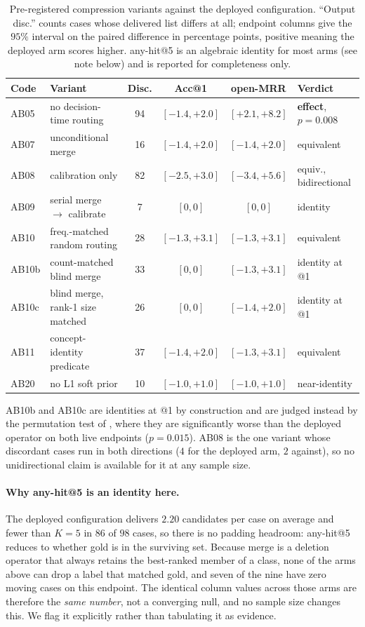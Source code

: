\begin{table}[t]
\centering
\scriptsize
\caption{Pre-registered compression variants against the deployed configuration. ``Output disc.'' counts cases whose delivered list differs at all; endpoint columns give the $95\%$ interval on the paired difference in percentage points, positive meaning the deployed arm scores higher. any-hit@5 is an algebraic identity for most arms (see note below) and is reported for completeness only.}
\label{tab:eq-equiv}
\begin{tabular}{llcccl}
\toprule
Code & Variant & Disc. & Acc@1 & open-MRR & Verdict \\
\midrule
AB05 & no decision-time routing & 94 & $[-1.4,+2.0]$ & $\mathbf{[+2.1,+8.2]}$ & \textbf{effect}, $p=0.008$ \\
AB07 & unconditional merge & 16 & $[-1.4,+2.0]$ & $[-1.4,+2.0]$ & equivalent \\
AB08 & calibration only & 82 & $[-2.5,+3.0]$ & $[-3.4,+5.6]$ & equiv., bidirectional \\
AB09 & serial merge $\rightarrow$ calibrate & 7 & $[0,0]$ & $[0,0]$ & identity \\
AB10 & freq.-matched random routing & 28 & $[-1.3,+3.1]$ & $[-1.3,+3.1]$ & equivalent \\
AB10b & count-matched blind merge & 33 & $[0,0]$ & $[-1.3,+3.1]$ & identity at @1 \\
AB10c & blind merge, rank-1 size matched & 26 & $[0,0]$ & $[-1.4,+2.0]$ & identity at @1 \\
AB11 & concept-identity predicate & 37 & $[-1.4,+2.0]$ & $[-1.3,+3.1]$ & equivalent \\
AB20 & no L1 soft prior & 10 & $[-1.0,+1.0]$ & $[-1.0,+1.0]$ & near-identity \\
\bottomrule
\end{tabular}

\noindent
AB10b and AB10c are identities at @1 by construction and are judged instead by the permutation test of , where they are significantly worse than the deployed operator on both live endpoints ($p=0.015$).
AB08 is the one variant whose discordant cases run in both directions ($4$ for the deployed arm, $2$ against), so no unidirectional claim is available for it at any sample size.
\end{table}

\paragraph{Why any-hit@5 is an identity here.}
The deployed configuration delivers $2.20$ candidates per case on average and fewer than $K{=}5$ in $86$ of $98$ cases, so there is no padding headroom: any-hit@5 reduces to whether gold is in the surviving set.
Because merge is a deletion operator that always retains the best-ranked member of a class, none of the arms above can drop a label that matched gold, and seven of the nine have zero moving cases on this endpoint.
The identical column values across those arms are therefore the \emph{same number}, not a converging null, and no sample size changes this.
We flag it explicitly rather than tabulating it as evidence.

